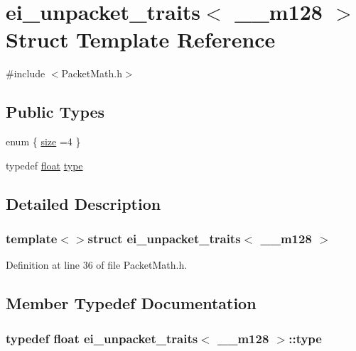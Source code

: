 \hypertarget{structei__unpacket__traits_3_01____m128_01_4}{\section{ei\-\_\-unpacket\-\_\-traits$<$ \-\_\-\-\_\-m128 $>$ Struct Template Reference}
\label{structei__unpacket__traits_3_01____m128_01_4}
}


{\ttfamily \#include $<$Packet\-Math.\-h$>$}

\subsection*{Public Types}
\begin{DoxyCompactItemize}
\item 
enum \{ \hyperlink{structei__unpacket__traits_3_01____m128_01_4_aac7f4e6b9de23f90164c838116d0e04ea8118586734f1b8635fd65d55aad37fc5}{size} =4
 \}
\item 
typedef \hyperlink{_super_l_u_support_8h_a6a1bb6ed41f44b60e7bd83b0e9945aa7}{float} \hyperlink{structei__unpacket__traits_3_01____m128_01_4_a2bfe3536415784500549e1ca6409b0e8}{type}
\end{DoxyCompactItemize}


\subsection{Detailed Description}
\subsubsection*{template$<$$>$struct ei\-\_\-unpacket\-\_\-traits$<$ \-\_\-\-\_\-m128 $>$}



Definition at line 36 of file Packet\-Math.\-h.



\subsection{Member Typedef Documentation}
\hypertarget{structei__unpacket__traits_3_01____m128_01_4_a2bfe3536415784500549e1ca6409b0e8}{
\subsubsection[{type}]{\setlength{\rightskip}{0pt plus 5cm}typedef {\bf float} {\bf ei\-\_\-unpacket\-\_\-traits}$<$ \-\_\-\-\_\-m128 $>$\-::{\bf type}}}\label{structei__unpacket__traits_3_01____m128_01_4_a2bfe3536415784500549e1ca6409b0e8}


